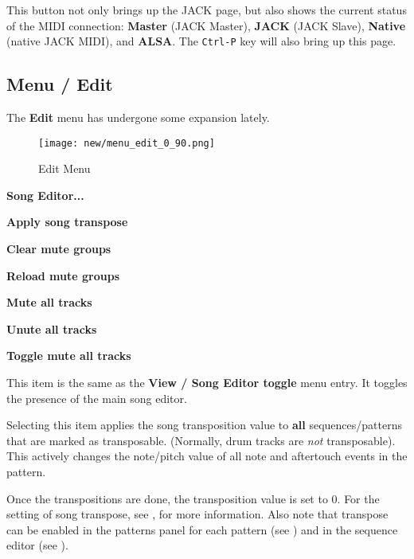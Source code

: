    This button not only brings up the JACK page, but also shows the current
   status of the MIDI connection:
   \textbf{Master} (JACK Master),
   \textbf{JACK} (JACK Slave),
   \textbf{Native} (native JACK MIDI),
   and \textbf{ALSA}.
   The \texttt{Ctrl-P} key will also bring up this page.

\subsection{Menu / Edit}
\label{subsec:seq64_menu_edit}

   The \textbf{Edit} menu has undergone some expansion lately.

\begin{figure}[H]
   \centering 
   \texttt{[image: new/menu\_edit\_0\_90.png]}
   \caption{Edit Menu}
   \label{fig:seq64_menu_edit_0_90}
\end{figure}

   \begin{enumber}
      \item \textbf{Song Editor...}
      \item \textbf{Apply song transpose}
      \item \textbf{Clear mute groups}
      \item \textbf{Reload mute groups}
      \item \textbf{Mute all tracks}
      \item \textbf{Unute all tracks}
      \item \textbf{Toggle mute all tracks}
   \end{enumber}

   \setcounter{ItemCounter}{0}      %

   This item is the same as the 
   \textbf{View / Song Editor toggle} menu entry.  It toggles the presence of
   the main song editor.


   Selecting this item applies the song transposition value to
   \textbf{all} sequences/patterns that are marked as transposable.
   (Normally, drum tracks are \textsl{not} transposable).
   This actively changes the note/pitch value of all note and aftertouch events
   in the pattern.

   Once the transpositions are done, the transposition value is set to 0.
   For the setting of song transpose, see
   , for more information.
   Also note that transpose can be enabled in the patterns panel for each
   pattern (see ) and
   in the sequence editor
   (see ).

